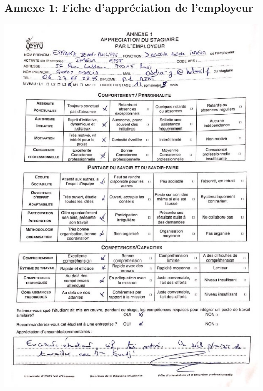 \documentclass{book}
\begin{document}
\subsection{Annexe 1: Fiche d'appréciation de l'employeur}
\includegraphics[scale=1.5]{appreciation_JPE.jpg}
\end{document}
